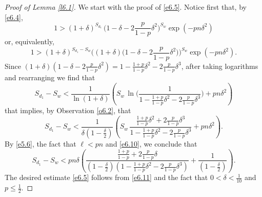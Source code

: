 \documentclass[10pt,a4paper]{amsart}
\newcommand{\mik}{\leqslant}
\begin{document}
\begin{proof}[Proof of Lemma \emph{\ref{l6.1}}]
We start with the proof of \eqref{e6.5}. Notice first that, by \eqref{e6.4},
\begin{equation} \label{e6.7}
1 > (1+\delta)^{S_{d_1}} \, \Big(1-\delta-2\frac{p}{1-p}\delta^2\Big)^{S_w}\exp(-pn\delta^2)
\end{equation}
or, equivalently,
\begin{equation} \label{e6.8}
1 >(1+\delta)^{S_{d_1}-S_w}
\Big((1+\delta) \big(1-\delta-2\frac{p}{1-p}\delta^2\big)\Big)^{S_w} \exp(-pn\delta^2).
\end{equation}
Since $(1+\delta)(1-\delta-2\frac{p}{1-p}\delta^2)=1-\frac{1+p}{1-p}\delta^2-2\frac{p}{1-p}\delta^3$,
after taking logarithms and rearranging we find that
\begin{equation} \label{e6.9}
S_{d_1}-S_w < \frac{1}{\ln(1+\delta)}
\left(S_w\, \ln\Big(\frac{1}{1-\frac{1+p}{1-p}\delta^2-2\frac{p}{1-p}\delta^3}\Big)+pn\delta^2\right)
\end{equation}
that implies, by Observation \ref{o6.2}, that
\begin{equation} \label{e6.10}
S_{d_1}-S_w < \frac{1}{\delta(1-\frac{\delta}{2})} \left( S_w \, \frac{\frac{1+p}{1-p}\delta^2+2\frac{p}{1-p}\delta^3}{1-\frac{1+p}{1-p}\delta^2-2\frac{p}{1-p}\delta^3}
+pn\delta^2\right).
\end{equation}
By \eqref{e5.6}, the fact that $\ell< pn$ and \eqref{e6.10}, we conclude that
\begin{equation} \label{e6.11}
S_{d_1}-S_w<pn\delta \left(\frac{\frac{1+p}{1-p}+2\frac{p}{1-p}\delta}{\left(1-\frac{\delta}{2}\right)
\left(1-\frac{1+p}{1-p}\delta^2-2\frac{p}{1-p}\delta^3\right)}+\frac{1}{\left(1-\frac{\delta}{2}\right)}\right).
\end{equation}
The desired estimate \eqref{e6.5} follows from \eqref{e6.11} and the fact that $0<\delta<\frac{1}{10}$ and $p\mik \frac12$.


\end{proof}
\end{document}
